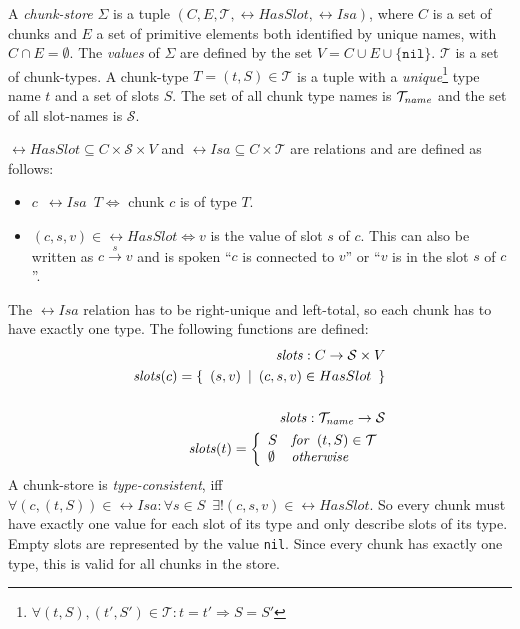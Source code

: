 \begin{definition}
A \emph{chunk-store} $\Sigma$ is a tuple $(C,E,\mathcal{T},\rel{HasSlot},\rel{Isa})$, where $C$ is a set of chunks and $E$ a set of primitive elements both identified by unique names, with $C \cap E = \emptyset$. The \emph{values} of $\Sigma$ are defined by the set $V = C \cup E \cup \{ \mathtt{nil} \}$. $\mathcal{T}$ is a set of chunk-types. A chunk-type $T = (t,S) \in \mathcal{T}$ is a tuple with a \emph{unique}\footnote{$\forall (t,S), (t',S') \in \mathcal{T}: t = t' \Rightarrow S = S'$} type name $t$ and a set of slots $S$. The set of all chunk type names is $\mathcal{T}_{\mathord{\mathit{name}}}$ and the set of all slot-names is $\mathcal{S}$. 

$\rel{HasSlot} \subseteq C \times \mathcal{S} \times V$ and $\rel{Isa} \subseteq C \times \mathcal{T}$ are relations and are defined as follows:

\begin{itemize}
 \item $c \enspace \rel{Isa} \enspace T \Leftrightarrow$ chunk $c$ is of type $T$.
 \item $(c,s,v) \in \rel{HasSlot} \Leftrightarrow v$ is the value of slot $s$ of $c$. This can also be written as $c \overset{s}{\longrightarrow} v$ and is spoken ``$c$ is connected to $v$'' or ``$v$ is in the slot $s$ of $c$''.
\end{itemize}

The $\rel{Isa}$ relation has to be right-unique and left-total, so each chunk has to have exactly one type. The following functions are defined:
\begin{align*}
\mathord{\mathit{slots}}: C \rightarrow \mathcal{S} \times V &\\
\mathord{\mathit{slots}}(c) = \{ \enspace (s,v) \enspace | \enspace (c,s,v) \in HasSlot \enspace \}&\\
\\
\mathord{\mathit{slots}}: \mathcal{T}_{\mathord{\mathit{name}}} \rightarrow \mathcal{S} &\\
      \mathord{\mathit{slots}}(t) = 
\left\{                     
  \begin{array}{ll}         
    S & \mathord{\mathit{for}} \enspace (t,S) \in \mathcal{T} \\ 
    \emptyset & \mathord{\mathit{otherwise}}
  \end{array}
\right.       &
\end{align*}
A chunk-store is \emph{type-consistent}, iff $\forall (c,(t,S)) \in \rel{Isa}: \forall s \in S \enspace \exists ! (c,s,v) \in \rel{HasSlot}$. So every chunk must have exactly one value for each slot of its type and only describe slots of its type. Empty slots are represented by the value \lstinline|nil|. Since every chunk has exactly one type, this is valid for all chunks in the store.


\end{definition}


